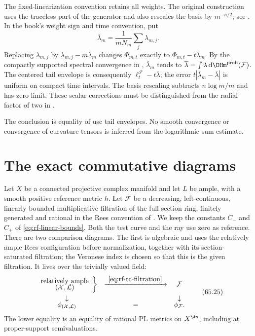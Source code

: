 The fixed-linearization convention retains all weights. The original construction uses the traceless part of the generator and also rescales the basis by $m^{-n/2}$; see \cite[Sections~2.1 and~4.2]{PS07}. In the book's weight sign and time convention, put
\[
 \overline\lambda_m=\frac{1}{mN_m}\sum_j\lambda_{m,j}.
\]
Replacing $\lambda_{m,j}$ by $\lambda_{m,j}-m\overline\lambda_m$ changes $\Phi_{m,t}$ exactly to $\Phi_{m,t}-t\overline\lambda_m$. By the compactly supported spectral convergence in , $\overline\lambda_m$ tends to $\overline\lambda=\int\lambda\,\mathrm d\DHm^{\mathrm{prob}}(\mathcal F)$. The centered tail envelope is consequently $\ell_t^{\mathcal F}-t\overline\lambda$; the error $t|\overline\lambda_m-\overline\lambda|$ is uniform on compact time intervals. The basis rescaling subtracts $n\log m/m$ and has zero limit. These scalar corrections must be distinguished from the radial factor of two in .

The conclusion is equality of usc tail envelopes. No smooth convergence or convergence of curvature tensors is inferred from the logarithmic sum estimate.

\section{The exact commutative diagrams}
\label{sec:rf-commutative-diagrams}

Let $X$ be a connected projective complex manifold and let $L$ be ample, with a smooth positive reference metric $h$. Let $\mathcal F$ be a decreasing, left-continuous, linearly bounded multiplicative filtration of the full section ring, finitely generated and rational in the Rees convention of . We keep the constants $C_-$ and $C_+$ of \eqref{eq:rf-linear-bounds}. Both the test curve and the ray use zero as reference. There are two comparison diagrams.
The first is algebraic and uses the relatively ample Rees configuration before normalization, together with its section-saturated filtration; the Veronese index is chosen so that this is the given filtration. It lives over the trivially valued field:
\[
\begin{array}{ccc}
\left.
 \begin{array}{c}
 \text{relatively ample}\\[-1mm]
 (\mathcal X,\mathcal L)
 \end{array}
\right\}
&\xrightarrow{\ \eqref{eq:rf-tc-filtration}\ }&
\mathcal F
\\[3mm]
\downarrow&&\downarrow
\\[-1mm]
\phi_{(\mathcal X,\mathcal L)}
&=&
\phi_{\mathcal F}.
\end{array}
\tag{65.25}\label{eq:rf-algebraic-square}
\]
The lower equality is an equality of rational PL metrics on
$X^{\An}$, including at proper-support semivaluations.

